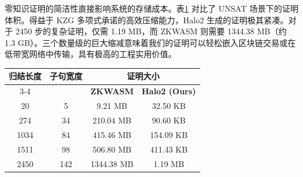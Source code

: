 零知识证明的简洁性直接影响系统的存储成本。表\ref{tab:proof-size} 对比了 UNSAT 场景下的证明体积。得益于 KZG 多项式承诺的高效压缩能力，Halo2 生成的证明极其紧凑。对于 2450 步的复杂证明，仅需 1.19 MB，而 ZKWASM 则需要 1344.38 MB（约 1.3 GB）。三个数量级的巨大缩减意味着我们的证明可以轻松嵌入区块链交易或在低带宽网络中传输，具有极高的工程实用价值。

\begin{table}[htbp]
\centering
{}
\label{tab:proof-size}
\begin{tabular}{cccc}
\toprule
\multirow{2}{*}{\textbf{归结长度}} & \multirow{2}{*}{\textbf{子句宽度}} & \multicolumn{2}{c}{\textbf{证明大小}} \\
\cline{3-4}
 & & \textbf{ZKWASM} & \textbf{Halo2 (Ours)} \\
\midrule
20 & 5 & 9.21 MB & 32.50 KB \\
274 & 34 & 210.04 MB & 90.60 KB \\
1034 & 84 & 415.46 MB & 154.09 KB \\
1511 & 98 & 506.80 MB & 411.43 KB \\
2450 & 142 & 1344.38 MB & 1.19 MB \\
\bottomrule
\end{tabular}
\end{table}
